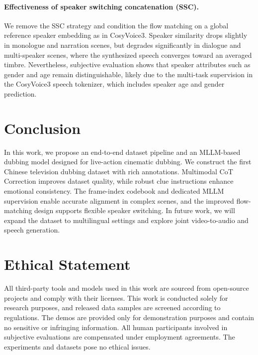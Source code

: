 \documentclass{article}
\begin{document}
\paragraph{Effectiveness of speaker switching concatenation (SSC).}
We remove the SSC strategy and condition the flow matching on a global reference speaker embedding as in CosyVoice3.
Speaker similarity drops slightly in monologue and narration scenes,
but degrades significantly in dialogue and multi-speaker scenes,
where the synthesized speech converges toward an averaged timbre.
Nevertheless, subjective evaluation shows that speaker attributes such as gender and age remain distinguishable,
likely due to the multi-task supervision in the CosyVoice3 speech tokenizer, which includes speaker age and gender prediction.


\section{Conclusion}
In this work, we propose an end-to-end dataset pipeline and an MLLM-based dubbing model designed for live-action cinematic dubbing.
We construct the first Chinese television dubbing dataset with rich annotations.
Multimodal CoT Correction improves dataset quality, while robust clue instructions enhance emotional consistency.
The frame-index codebook and dedicated MLLM supervision enable accurate alignment in complex scenes,
and the improved flow-matching design supports flexible speaker switching.
In future work, we will expand the dataset to multilingual settings and explore joint video-to-audio and speech generation.


\appendix

\section*{Ethical Statement}
All third-party tools and models used in this work are sourced from open-source projects and comply with their licenses. 
This work is conducted solely for research purposes, and released data samples are screened according to regulations. 
The demos are provided only for demonstration purposes and contain no sensitive or infringing information. 
All human participants involved in subjective evaluations are compensated under employment agreements. 
The experiments and datasets pose no ethical issues.




\end{document}
